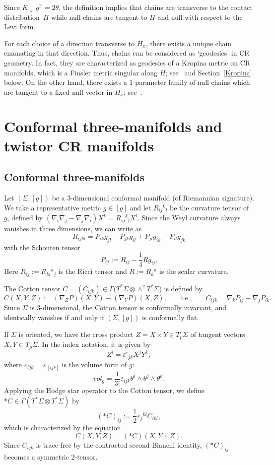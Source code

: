 \documentclass[11pt]{article}
\numberwithin{equation}{section}
\newcommand\e{\varepsilon}
\renewcommand\th{\theta}
\numberwithin{equation}{section}
\begin{document}
Since $K\lrcorner\, g^{\mathrm{F}}=2\th$, the definition implies that chains are transverse to the contact distribution~$H$ while null chains are tangent to $H$ and null with respect to the Levi form.

For each choice of a direction transverse to $H_x$, there exists a unique chain emanating in that direction. Thus, chains can be considered as `geodesics' in CR geometry. In fact, they are characterized as geodesics of a Kropina metric on CR manifolds, which is a Finsler metric singular along $H$; see~\cite{CMMM} and Section~\ref{Kropina} below. On the other hand, there exists a 1-parameter family of null chains which are tangent to a fixed null vector in $H_x$; see~\cite{Koch}.

\section{Conformal three-manifolds and twistor CR manifolds}\label{conformal-three}

\subsection{Conformal three-manifolds}
Let $(\Sigma, [g])$ be a $3$-dimensional conformal manifold (of Riemannian signature). We take a representative metric $g\in[g]$ and let $R_{ij}{}^k{}_l$ be the curvature tensor of $g$, defined by $(\nabla_i\nabla_j-\nabla_j\nabla_i)X^k=R_{ij}{}^k{}_lX^l$. Since the Weyl curvature always vanishes in three dimensions, we can write as
\begin{equation}\label{curvature-tensor}
R_{ijkl}=P_{ik}g_{jl}-P_{jk}g_{il}+P_{jl}g_{ik}-P_{il}g_{jk}
\end{equation}
with the Schouten tensor
\[
P_{ij}:=R_{ij}-\frac{1}{4}Rg_{ij}.
\]
Here $R_{ij}:=R_{ki}{}^k{}_j$ is the Ricci tensor and $R:=R_k{}^k$ is the scalar curvature.

The Cotton tensor $C=(C_{ijk})\in \Gamma\bigl(T^*\Sigma\otimes \wedge^2 T^*\Sigma\bigr)$ is defined by
\[
C(X, Y, Z):=(\nabla_Z P)(X, Y)-(\nabla_Y P)(X, Z), \qquad \text{i.e.,}\qquad
C_{ijk}=\nabla_k P_{ij}-\nabla_j P_{ik}.
\]
Since $\Sigma$ is 3-dimensional, the Cotton tensor is conformally invariant, and identically vanishes if and only if $(\Sigma, [g])$ is conformally flat.

If $\Sigma$ is oriented, we have the cross product $Z=X\times Y\in T_p\Sigma$ of tangent vectors $X, Y\in T_p\Sigma$. In the index notation, it is given by
\[
Z^i=\e^i{}_{jk}X^j Y^k,
\]
where $\e_{ijk}=\e_{[ijk]}$ is the volume form of $g$:
\[
vol_g=\frac{1}{3!}\e_{ijk}\th^i\wedge \th^j\wedge \th^k.
\]
Applying the Hodge star operator to the Cotton tensor, we define $*C\in\Gamma(T^*\Sigma\otimes T^*\Sigma)$ by
\[
(*C)_{ij}:=\frac{1}{2}\varepsilon_j{}^{kl}C_{ikl},
\]
which is characterized by the equation
\[
C(X, Y, Z)=(*C)(X, Y\times Z).
\]
Since $C_{ijk}$ is trace-free by the contracted second Bianchi identity, $(*C)_{ij}$ becomes a symmetric 2-tensor.
\end{document}
